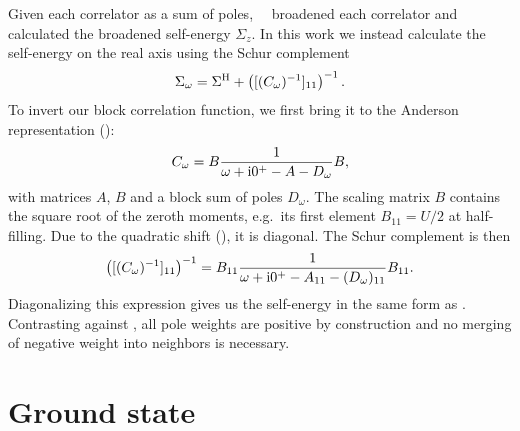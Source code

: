 Given each correlator as a sum of poles,~\citeauthor{Kugler2022}~\cite{Kugler2022} broadened
each correlator and calculated the broadened self-energy $\Sigma_z$.
In this work we instead calculate the self-energy on the real axis
using the Schur complement~\cite{Schur1917}
\begin{equation}
    \Sigma_\omega = \Sigma^{\mathrm{H}} + \left([(C_\omega)^{-1}]_{11}\right)^{-1}.
\end{equation}
To invert our block correlation function, we first bring it to
the Anderson representation ():
\begin{equation}
    C_\omega = B\frac{1}{\omega + \mathrm{i}0^+ - A - D_\omega}B,
\end{equation}
with matrices $A$, $B$ and a block sum of poles $D_\omega$.
The scaling matrix $B$ contains the square root of the zeroth moments,
e.g.\ its first element $B_{11} = U/2$ at half-filling.
Due to the quadratic shift (), it is diagonal.
The Schur complement is then
\begin{equation}
    \left([(C_\omega)^{-1}]_{11}\right)^{-1}
    =
    B_{11} \frac{1}{\omega + \mathrm{i}0^+ - A_{11} - (D_\omega)_{11}} B_{11}.
\end{equation}
Diagonalizing this expression gives us the self-energy in the same form as
.
Contrasting against ,
all pole weights are positive by construction
and no merging of negative weight into neighbors is necessary.

\section{Ground state}

